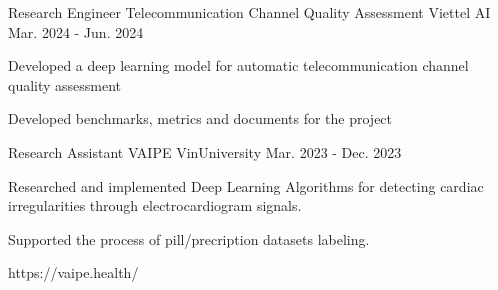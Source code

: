 \begin{cventries}
\cventry
    {Research Engineer} %
    {Telecommunication Channel Quality Assessment} %
    {Viettel AI} %
    {Mar. 2024 - Jun. 2024} %
    {
      \begin{cvitems} %
        \item Developed a deep learning model for automatic telecommunication channel quality assessment
        \item Developed benchmarks, metrics and documents for the project
      \end{cvitems}
    }
\cventry
    {Research Assistant} %
    {VAIPE} %
    {VinUniversity} %
    {Mar. 2023 - Dec. 2023} %
    {
      \begin{cvitems} %
        \item {Researched and implemented Deep Learning Algorithms for detecting cardiac irregularities through electrocardiogram signals.}
        \item {Supported the process of pill/precription datasets labeling.}
        \item {https://vaipe.health/}
      \end{cvitems}
    }
    
\end{cventries}
